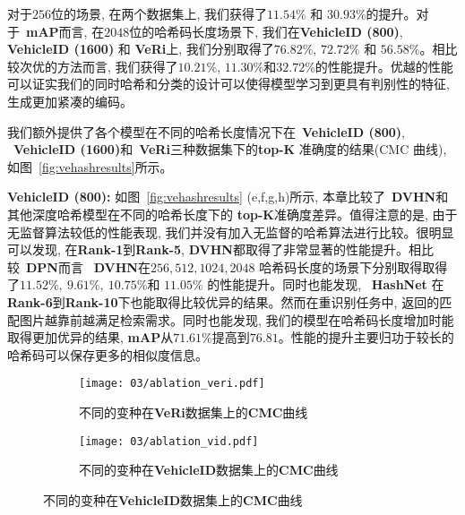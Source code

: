对于$256$位的场景, 在两个数据集上, 我们获得了$11.54 \%$ 和 $30.93 \%$的提升。对于~\textbf{mAP}而言, 在$2048$位的哈希码长度场景下, 我们在\textbf{VehicleID (800)}, \textbf{VehicleID (1600)} 和 \textbf{VeRi}上, 我们分别取得了$76.82 \%$, $72.72 \%$ 和 $56.58 \%$。相比较次优的方法而言, 我们获得了$10.21 \%$, $11.30 \%$和$32.72\%$的性能提升。优越的性能可以证实我们的同时哈希和分类的设计可以使得模型学习到更具有判别性的特征, 生成更加紧凑的编码。\par 
我们额外提供了各个模型在不同的哈希长度情况下在~\textbf{VehicleID (800)}, ~\textbf{VehicleID (1600)}和~\textbf{VeRi}三种数据集下的\textbf{top-K} 准确度的结果(CMC 曲线), 如图~\ref{fig:vehashresults}所示。 \par
\textbf{VehicleID (800):} 如图~\ref{fig:vehashresults} (e,f,g,h)所示, 本章比较了~\textbf{DVHN}和其他深度哈希模型在不同的哈希长度下的 \textbf{top-K}准确度差异。值得注意的是, 由于无监督算法较低的性能表现, 我们并没有加入无监督的哈希算法进行比较。很明显可以发现, 在\textbf{Rank-1}到\textbf{Rank-5}, \textbf{DVHN}都取得了非常显著的性能提升。相比较~\textbf{DPN}而言 ~\textbf{DVHN}在$256, 512, 1024, 2048$ 哈希码长度的场景下分别取得取得了$11.52\%,~9.61\%,~10.75\% $和 $11.05\%$ 的性能提升。同时也能发现, ~\textbf{HashNet} 在\textbf{Rank-6}到\textbf{Rank-10}下也能取得比较优异的结果。然而在重识别任务中, 返回的匹配图片越靠前越满足检索需求。同时也能发现, 我们的模型在哈希码长度增加时能取得更加优异的结果, \textbf{mAP}从$71.61\%$提高到$76.81$。性能的提升主要归功于较长的哈希码可以保存更多的相似度信息。 \par


\begin{figure}[!htp]
    \centering
    \begin{subfigure}{0.45\textwidth}
      \centering
      \texttt{[image: 03/ablation\_veri.pdf]}
      \caption{不同的变种在\textbf{VeRi}数据集上的\textbf{CMC}曲线}
    \end{subfigure}
    \hspace{1cm}
    \begin{subfigure}{0.45\textwidth}
      \centering
      \texttt{[image: 03/ablation\_vid.pdf]}
      \caption{不同的变种在\textbf{VehicleID}数据集上的\textbf{CMC}曲线}
    \end{subfigure}
    \label{fig:ablationcmc}
  \end{figure}

